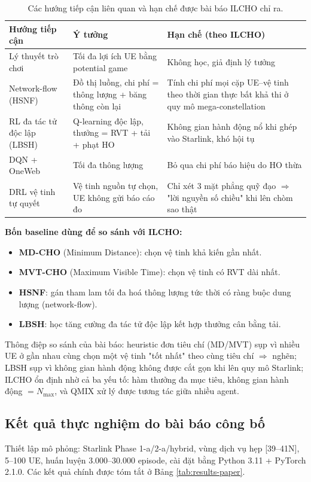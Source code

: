 \documentclass{article} %
\begin{document}
\begin{table}[h!]
\centering
\caption{Các hướng tiếp cận liên quan và hạn chế được bài báo ILCHO chỉ ra.}
\label{tab:related}
\begin{tabular}{|>{\raggedright\arraybackslash}p{3.2cm}|>{\raggedright\arraybackslash}p{4.8cm}|>{\raggedright\arraybackslash}p{5cm}|}
\hline
\textbf{Hướng tiếp cận} & \textbf{Ý tưởng} & \textbf{Hạn chế (theo ILCHO)} \\
\hline
Lý thuyết trò chơi & Tối đa lợi ích UE bằng potential game & Không học, giả định lý tưởng \\
\hline
Network-flow (HSNF) & Đồ thị luồng, chi phí = thông lượng + băng thông còn lại & Tính chi phí mọi cặp UE--vệ tinh theo thời gian thực bất khả thi ở quy mô mega-constellation \\
\hline
RL đa tác tử độc lập (LBSH) & Q-learning độc lập, thưởng = RVT + tải + phạt HO & Không gian hành động nổ khi ghép vào Starlink, khó hội tụ \\
\hline
DQN + OneWeb & Tối đa thông lượng & Bỏ qua chi phí báo hiệu do HO thừa \\
\hline
DRL vệ tinh tự quyết & Vệ tinh nguồn tự chọn, UE không gửi báo cáo đo & Chỉ xét 3 mặt phẳng quỹ đạo $\Rightarrow$ "lời nguyền số chiều" khi lên chòm sao thật \\
\hline
\end{tabular}
\end{table}

\textbf{Bốn baseline dùng để so sánh với ILCHO:}
\begin{itemize}
    \item \textbf{MD-CHO} (Minimum Distance): chọn vệ tinh khả kiến gần nhất.
    \item \textbf{MVT-CHO} (Maximum Visible Time): chọn vệ tinh có RVT dài nhất.
    \item \textbf{HSNF}: gán tham lam tối đa hoá thông lượng tức thời có ràng buộc dung lượng (network-flow).
    \item \textbf{LBSH}: học tăng cường đa tác tử độc lập kết hợp thưởng cân bằng tải.
\end{itemize}
Thông điệp so sánh của bài báo: heuristic đơn tiêu chí (MD/MVT) sụp vì nhiều UE ở gần nhau cùng chọn một vệ tinh "tốt nhất" theo cùng tiêu chí $\Rightarrow$ nghẽn; LBSH sụp vì không gian hành động không được cắt gọn khi lên quy mô Starlink; ILCHO ổn định nhờ cả ba yếu tố: hàm thưởng đa mục tiêu, không gian hành động $=N_{\max}$, và QMIX xử lý được tương tác giữa nhiều agent.

\subsection{Kết quả thực nghiệm do bài báo công bố}
Thiết lập mô phỏng: Starlink Phase 1-a/2-a/hybrid, vùng dịch vụ hẹp [39--41\textdegree{}N], 5--100 UE, huấn luyện 3.000--30.000 episode, cài đặt bằng Python 3.11 + PyTorch 2.1.0. Các kết quả chính được tóm tắt ở Bảng \ref{tab:results-paper}.
\end{document}
